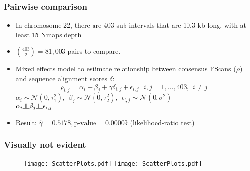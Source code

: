 \documentclass[10pt,dvipsnames,table]{beamer}
\begin{document}
\begin{frame}
\frametitle{Pairwise comparison}
\begin{itemize}
\item In chromosome 22, there are 403 sub-intervals that are 10.3 kb long, with at least 15 Nmaps depth
\item $ \binom {403} {2} = 81,003 $ pairs to compare. 
\item Mixed effects model to estimate relationship between consensus FScans ($\rho$) and sequence alignment scores $\delta$:
\[ 
\rho_{i,j} = \alpha_i + \beta_j + \gamma \delta_{i,j} + \epsilon_{i,j}\ \ \ i, j = 1, \dots, 403,\ \ i \ne j
\]
$\alpha_i \sim \mathcal{N}(0, \tau_1^2), \ \ \beta_j \sim \mathcal{N}(0, \tau_2^2), \ \ \epsilon_{i,j} \sim \mathcal{N}(0, \sigma^2)$ \\
$ \alpha_i \indep \beta_j \indep \epsilon_{i,j}$
\item Result: $\hat{\gamma} = 0.5178, \text{p-value} = 0.00009$ (likelihood-ratio test)
\end{itemize}

\end{frame}

\begin{frame}
\frametitle{Visually not evident}
\begin{figure}
\begin{centering}
\texttt{[image: ScatterPlots.pdf]}
\texttt{[image: ScatterPlots.pdf]}
\end{centering}
\end{figure}

\end{frame}
\end{document}

